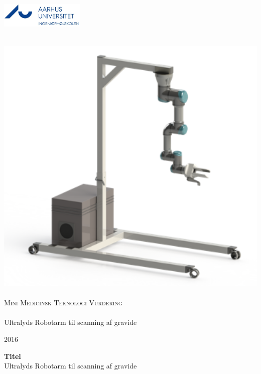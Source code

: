 \begin{titlingpage}
\includegraphics[width=0.3\textwidth]{Figurer/AU}%
\begin{center}
~ \\[0.5cm]

\includegraphics[width=1.0\textwidth]{Figurer/StativMedUR3Render}~\\[1cm]


\textsc{\Large Mini Medicinsk Teknologi Vurdering }\\[0.5cm]

\noindent\makebox[\linewidth]{\rule{\textwidth}{0.4pt}}\\
[0.5cm]{\HUGE Ultralyds Robotarm til scanning af gravide}
\noindent\makebox[\linewidth]{\rule{\textwidth}{0.4pt}}

\end{center}


\vfill

\begin{center}
{\LARGE 2016}
\end{center}

\textbf{Titel}\\
Ultralyds Robotarm til scanning af gravide


\end{titlingpage}

